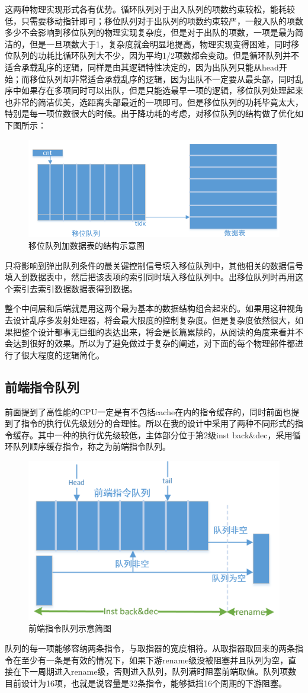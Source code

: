 \documentclass[11pt]{article}
\begin{document}
这两种物理实现形式各有优势。循环队列对于出入队列的项数约束较松，能耗较低，只需要移动指针即可；移位队列对于出队列的项数约束较严，一般入队的项数多少不会影响到移位队列的物理实现复杂度，但是对于出队的项数，一项是最为简洁的，但是一旦项数大于1，复杂度就会明显地提高，物理实现变得困难，同时移位队列的功耗比循环队列大不少，因为平均1/2项数都会变动。但是循环队列并不适合承载乱序的逻辑，同样是由其逻辑特性决定的，因为出队列只能从head开始；而移位队列却非常适合承载乱序的逻辑，因为出队不一定要从最头部，同时乱序中如果存在多项同时可以出队，但是只能选最早一项的逻辑，移位队列处理起来也非常的简洁优美，选距离头部最近的一项即可。但是移位队列的功耗毕竟太大，特别是每一项位数很大的时候。出于降功耗的考虑，对移位队列的结构做了优化如下图所示：
\begin{figure}[H]
	\centering
	\includegraphics[width=0.7\linewidth]{figs/fifotable.png}
	\caption{移位队列加数据表的结构示意图}
\end{figure}
只将影响到弹出队列条件的最关键控制信号填入移位队列中，其他相关的数据信号填入到数据表中，然后把该表项的索引同时填入移位队列中。出移位队列时再用这个索引去索引数据数据表得到数据。

整个中间层和后端就是用这两个最为基本的数据结构组合起来的。如果用这种视角去设计乱序多发射处理器，将会最大限度的控制复杂度。但是复杂度依然很大，如果把整个设计都事无巨细的表达出来，将会是长篇累牍的，从阅读的角度来看并不会达到很好的效果。所以为了避免做过于复杂的阐述，对下面的每个物理部件都进行了很大程度的逻辑简化。
\subsection{前端指令队列}
前面提到了高性能的CPU一定是有不包括cache在内的指令缓存的，同时前面也提到了指令的执行优先级划分的合理性。所以在我的设计中采用了两种不同形式的指令缓存。其中一种的执行优先级较低，主体部分位于第2级inst back\&dec，采用循环队列顺序缓存指令，称之为前端指令队列。
\begin{figure}[H]
	\centering
	\includegraphics[width=0.7\linewidth]{figs/frontqueue.png}
	\caption{前端指令队列示意简图}
\end{figure}
队列的每一项能够容纳两条指令，与取指器的宽度相符。从取指器取回来的两条指令在至少有一条是有效的情况下，如果下游rename级没被阻塞并且队列为空，直接在下一周期进入rename级，否则进入队列，队列满时阻塞前端取值。队列项数目前设计为16项，也就是说容量是32条指令，能够抵挡16个周期的下游阻塞。
\end{document}
